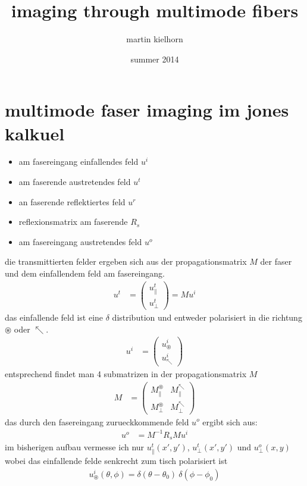 \documentclass{article}
\author{martin kielhorn}
\title{imaging through multimode fibers}
\date{summer 2014}
\begin{document}
\maketitle
\section{multimode faser imaging im jones kalkuel}

\begin{itemize}
\item am fasereingang einfallendes feld $u^i$
\item am faserende austretendes feld $u^t$
\item an faserende reflektiertes feld $u^r$
\item reflexionsmatrix am faserende $R_s$
\item am fasereingang austretendes feld $u^o$
\end{itemize}

die transmittierten felder ergeben sich aus der propagationsmatrix $M$
der faser und dem einfallendem feld am fasereingang.
\begin{align}
  u^t &= \begin{pmatrix}u^t_\parallel \\ u^t_\perp\end{pmatrix} = M u^i
\end{align}
das einfallende feld ist eine $\delta$ distribution und entweder
polarisiert in die richtung $\circledast$ oder $\nwarrow$.
\begin{align}
  u^i &= \begin{pmatrix}u^i_\circledast \\ u^i_\nwarrow\end{pmatrix}
\end{align}
entsprechend findet man 4 submatrizen in der propagationsmatrix $M$
\begin{align}
  M &= \begin{pmatrix}
    M^\circledast_\parallel & M^\nwarrow_\parallel \\
    M^\circledast_\perp & M^\nwarrow_\perp 
  \end{pmatrix}
\end{align}
das durch den fasereingang zurueckkommende feld $u^o$ ergibt sich aus:
\begin{align}
  u^o &= M^{-1} R_s M u^i
\end{align}
im bisherigen aufbau vermesse ich nur $u^t_\parallel(x',y')$,
$u^t_\perp(x',y')$ und $u^o_\perp(x,y)$ wobei das einfallende felde
senkrecht zum tisch polarisiert ist
\begin{align}
  u^i_\circledast(\theta,\phi) = \delta(\theta-\theta_0)\ \delta(\phi-\phi_0)
\end{align}
 
\end{document}
